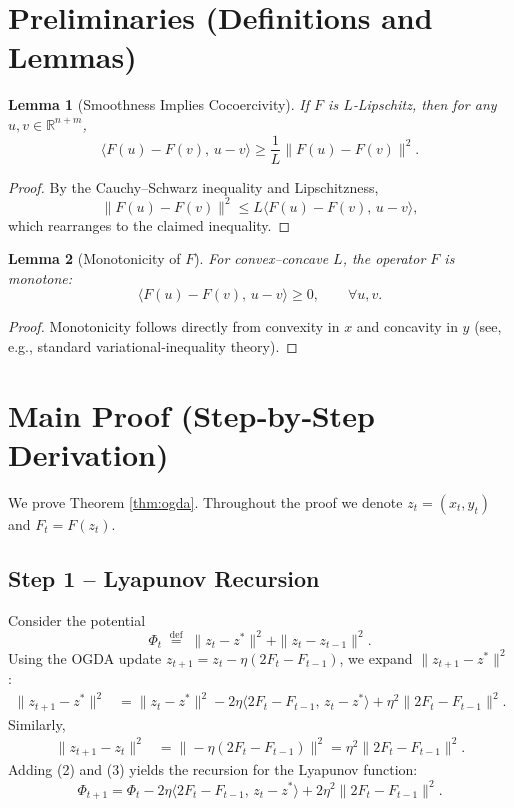 \documentclass{article}
\newtheorem{lemma}{Lemma}
\newcommand{\R}{\mathbb{R}}
\begin{document}
\section*{Preliminaries (Definitions and Lemmas)}
\begin{lemma}[Smoothness Implies Cocoercivity]\label{lem:coco}
If $F$ is $L$‑Lipschitz, then for any $u,v\in\R^{n+m}$,
\[
\langle F(u)-F(v),\,u-v\rangle\ge\frac{1}{L}\|F(u)-F(v)\|^{2}.
\]
\end{lemma}
\begin{proof}
By the Cauchy–Schwarz inequality and Lipschitzness,
\[
\|F(u)-F(v)\|^{2}\le L\langle F(u)-F(v),\,u-v\rangle,
\]
which rearranges to the claimed inequality. \hfill\qedsymbol
\end{proof}

\begin{lemma}[Monotonicity of $F$]\label{lem:mono}
For convex–concave $L$, the operator $F$ is monotone:
\[
\langle F(u)-F(v),\,u-v\rangle\ge0,\qquad\forall u,v.
\]
\end{lemma}
\begin{proof}
Monotonicity follows directly from convexity in $x$ and concavity in $y$
(see, e.g., standard variational‑inequality theory). \hfill\qedsymbol
\end{proof}

\section*{Main Proof (Step‑by‑Step Derivation)}
We prove Theorem \ref{thm:ogda}.  Throughout the proof we denote $z_{t}=(x_{t},y_{t})$
and $F_{t}=F(z_{t})$.

\subsection*{Step 1 – Lyapunov Recursion}
Consider the potential
\[
\Phi_{t}\;\stackrel{\text{def}}{=}\;\|z_{t}-z^{*}\|^{2}+ \|z_{t}-z_{t-1}\|^{2}.
\tag{1}
\]
Using the OGDA update $z_{t+1}=z_{t}-\eta(2F_{t}-F_{t-1})$, we expand $\|z_{t+1}-z^{*}\|^{2}$:
\begin{align}
\|z_{t+1}-z^{*}\|^{2}
&=\|z_{t}-z^{*}\|^{2}
-2\eta\langle 2F_{t}-F_{t-1},\,z_{t}-z^{*}\rangle
+\eta^{2}\|2F_{t}-F_{t-1}\|^{2}.
\tag{2}
\end{align}
Similarly,
\begin{align}
\|z_{t+1}-z_{t}\|^{2}
&=\|\!-\eta(2F_{t}-F_{t-1})\|^{2}
=\eta^{2}\|2F_{t}-F_{t-1}\|^{2}.
\tag{3}
\end{align}
Adding (2) and (3) yields the recursion for the Lyapunov function:
\[
\Phi_{t+1}
= \Phi_{t}
-2\eta\langle 2F_{t}-F_{t-1},\,z_{t}-z^{*}\rangle
+2\eta^{2}\|2F_{t}-F_{t-1}\|^{2}.
\tag{4}
\]
\end{document}
